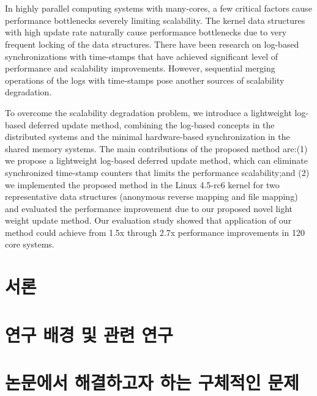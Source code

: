 \documentclass[doctor,korean,final]{kmu}
\begin{document}
\normalsize{
\hfill \break
\begin{center}
\\
\end{center}

\begin{center}
\\
\end{center}
\hfill \break


In highly parallel computing systems with many-cores, a few critical factors
cause performance bottlenecks severely limiting scalability.
The kernel data structures with high update rate naturally cause performance
bottlenecks due to very frequent locking of the data structures.
There have been research on log-based synchronizations with time-stamps that
have achieved significant level of performance and scalability improvements.
However, sequential merging operations of the logs with time-stamps pose another
sources of scalability degradation.

To overcome the scalability degradation problem, we introduce a lightweight
log-based deferred update method, combining the log-based concepts in the
distributed systems and the minimal hardware-based synchronization in the
shared memory systems.
The main contributions of the proposed method are:(1) we propose a lightweight
log-based deferred update method, which can eliminate synchronized time-stamp
counters that limits the performance scalability;and (2) we implemented the
 proposed method in the Linux 4.5-rc6 kernel for two representative data
 structures (anonymous reverse mapping and file mapping) and evaluated the
performance improvement due to our proposed novel light weight update method.
Our evaluation study showed that application of our method could
achieve from 1.5x through 2.7x performance improvements in 120 core
systems.}


\newpage \setcounter{pagemarker}{\value{page}}%

\chapter{서론}

\chapter{연구 배경 및 관련 연구}\label{sec:related}

\chapter{논문에서 해결하고자 하는 구체적인 문제}\label{sec:problem}

\end{document}
